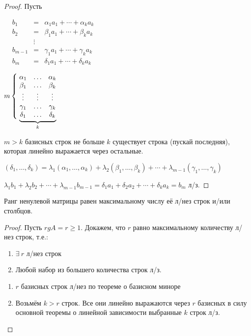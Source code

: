 \begin{proof} Пусть

$\begin{matrix}
& b_1&=&\alpha_1a_1+\cdots+\alpha_ka_k & \\
& b_2&=&\beta_1a_1+\cdots+\beta_ka_k & \\
& &\vdots & &\\
& b_{m-1}&=&\gamma_1a_1+\cdots+\gamma_ka_k & \\
& b_m&=&\delta_1a_1+\cdots+\delta_ka_k &
\end{matrix}$

$m\left\{\lefteqn{\phantom{\begin{matrix}\alpha_1 \\ \beta_1 \\ \vdots \\ \gamma_1 \\ \delta_1 \end{matrix}}}\right.
\underbrace{
\begin{matrix}
\alpha_1 & \ldots & \alpha_k \\
\beta_1  & \ldots & \beta_k  \\
\vdots   & \vdots & \vdots   \\
\gamma_1 & \ldots & \gamma_k \\
\delta_1 & \ldots & \delta_k
\end{matrix}}_{k}$

$m>k$ \then базисных строк не больше $k$ \then существует строка (пускай последняя), которая линейно выражается через остальные.

$(\delta_1,\ldots,\delta_k)=\lambda_1(\alpha_1,\ldots,\alpha_k)+\lambda_2(\beta_1,\ldots,\beta_k)+\cdots+\lambda_{m-1}(\gamma_1,\ldots,\gamma_k)$

$\lambda_1b_1+\lambda_2b_2+\cdots+\lambda_{m-1}b_{m-1}=\delta_1a_1+\delta_2a_2+\cdots+\delta_ka_k=b_m$ \then л/з.
\end{proof}
\begin{theor}

Ранг ненулевой матрицы равен максимальному числу её л/нез строк и/или столбцов.
\end{theor}
\begin{proof}
Пусть $rg A=r\geq1$. Докажем, что $r$ равно максимальному количеству л/нез строк, т.е.: \begin{enumerate}
\item $\exists\ r$ л/нез строк
\item Любой набор из большего количества строк л/з.
\end{enumerate}
\begin{enumerate}
\item $r$ базисных строк л/нез по теореме о базисном миноре
\item Возьмём $k>r$ строк. Все они линейно выражаются через $r$ базисных \then в силу основной теоремы о линейной зависимости выбранные $k$ строк л/з.
\end{enumerate}
\end{proof}
